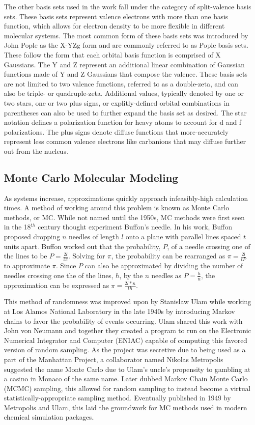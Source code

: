 The other basis sets used in the work fall under the category of split-valence basis sets.
These basis sets represent valence electrons with more than one basis function, which allows for electron density to be more flexible in different molecular systems.
The most common form of these basis sets was introduced by John Pople as the X-YZg form and are commonly referred to as Pople basis sets.\cite{PopleBS}
These follow the form that each orbital basis function is comprised of X Gaussians.
The Y and Z represent an additional linear combination of Gaussian functions made of Y and Z Gaussians  that compose the valence. 
These basis sets are not limited to two valence functions, referred to as a double-zeta, and can also be triple- or quadruple-zeta.
Additional values, typically denoted by one or two stars, one or two plus signs, or explitly-defined orbital combinations in parentheses can also be used to further expand the basis set as desired.
The star notation defines a polarization function for heavy atoms to account for d and f polarizations.
The plus signs denote diffuse functions that more-accurately represent less common valence electrons like carbanions that may diffuse further out from the nucleus.

\subsection{Monte Carlo Molecular Modeling}

As systems increase, approximations quickly approach infeasibly-high calculation times.
A method of working around this problem is known as Monte Carlo methods, or MC.
While not named until the 1950s, MC methods were first seen in the 18$^{th}$ century thought experiment Buffon's needle.\cite{buffon}
In his work, Buffon proposed dropping $n$ needles of length $l$ onto a plane with parallel lines spaced $t$ units apart.
Buffon worked out that the probability, $P$, of a needle crossing one of the lines to be $P=\frac{2l}{t\pi}$.
Solving for $\pi$, the probability can be rearranged as $\pi=\frac{2l}{tP}$ to approximate $\pi$.
Since $P$ can also be approximated by dividing the number of needles crossing one the of the lines, $h$, by the $n$ needles as $P=\frac{h}{n}$, the approximation can be expressed as $\pi=\frac{2l*n}{th}$.

This method of randomness was improved upon by Stanislaw Ulam while working at Los Alamos National Laboratory in the late 1940s by introducing Markov chains to favor the probability of events occurring.
Ulam shared this work with John von Neumann and together they created a program to run on the Electronic Numerical Integrator and Computer (ENIAC) capable of computing this favored version of random sampling.
As the project was secretive due to being used as a part of the Manhattan Project, a collaborator named Nikolas Metropolis suggested the name Monte Carlo due to Ulam's uncle's propensity to gambling at a casino in Monaco of the same name.\cite{MCOrigins}
Later dubbed Markov Chain Monte Carlo (MCMC) sampling, this allowed for random sampling to instead become a virtual statistically-appropriate sampling method.
Eventually published in 1949 by Metropolis and Ulam, this laid the groundwork for MC methods used in modern chemical simulation packages. 


